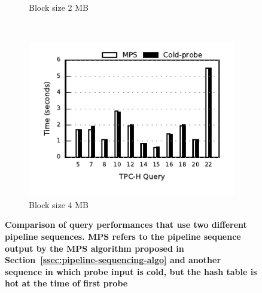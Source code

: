 \begin{figure}[ht]
\begin{subfigure}[ht]{0.32\textwidth}
		\caption{Block size 2 MB}
	\end{subfigure}
	~
	\begin{subfigure}[ht]{0.32\textwidth}
		\includegraphics[width=\textwidth]{pipeline/figures/coldprobe-sequence-20threads-tpch-sf50-bs4mb-withlip-colstore}	
		\caption{Block size 4 MB}
	\end{subfigure}
	\caption{\textbf{Comparison of query performances that use two different pipeline sequences. MPS refers to the pipeline sequence output by the MPS algorithm proposed in Section~\ref{ssec:pipeline-sequencing-algo} and another sequence in which probe input is cold, but the hash table is hot at the time of first probe}}
	\label{fig:pipeline-sequence-comparison}
\end{figure}

